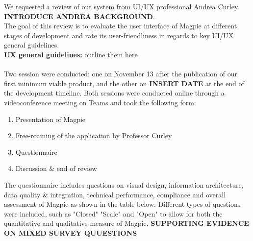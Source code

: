 We requested a review of our system from UI/UX professional Andrea Curley. \textbf{INTRODUCE ANDREA BACKGROUND}.\\
The goal of this review is to evaluate the user interface of Magpie at different stages of development and rate its user-friendliness in regards to key UI/UX general guidelines.\\
\textbf{UX general guidelines: } outline them here \\ \\

Two session were conducted: one on November 13 after the publication of our first minimum viable product, and the other on \textbf{INSERT DATE} at the end of the development timeline. Both sessions were conducted online through a videoconference meeting on Teams and took the following form:
\begin{enumerate}
    \item Presentation of Magpie
    \item Free-roaming of the application by Professor Curley
    \item Questionnaire
    \item Discussion \& end of review
\end{enumerate}
The questionnaire includes questions on visual design, information architecture, data quality \& integration, technical performance, compliance and overall assessment of Magpie as shown in the table below. Different types of questions were included, such as "Closed" "Scale" and "Open" to allow for both the quantitative and qualitative measure of Magpie. \textbf{SUPPORTING EVIDENCE ON MIXED SURVEY QUUESTIONS}\\ \\
